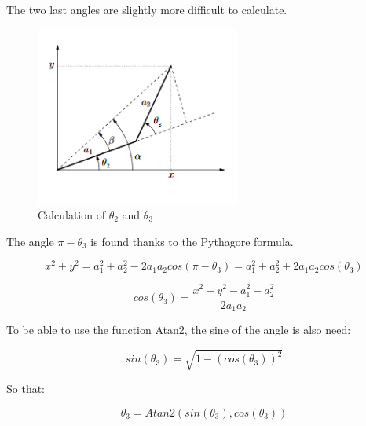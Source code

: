 \noindent The two last angles are slightly more difficult to calculate.\\

\begin{figure}[!ht]
	\centering
    \includegraphics[width = 0.6\textwidth]{Images/angles}
    \caption{Calculation of $\theta_2$ and $\theta_3$}
    \label{fig:angles}
\end{figure}

\noindent The angle $\pi - \theta_3$ is found thanks to the Pythagore formula.\\

\begin{center}
	\begin{equation}
		x^2 + y^2 = a_1^2 + a_2^2 - 2a_1a_2cos(\pi - \theta_3) = a_1^2 + a_2^2 + 2a_1a_2cos(\theta_3)
	\end{equation}
\end{center}

\begin{center}
	\begin{equation}
		cos(\theta_3) = \frac{x^2 + y^2 - a_1^2 - a_2^2}{2a_1a_2}
	\end{equation}
\end{center}

\noindent To be able to use the function Atan2, the sine of the angle is also need:\\

\begin{center}
	\begin{equation}
		sin(\theta_3) = \sqrt{1 - (cos(\theta_3))^2}
	\end{equation}
\end{center}

\noindent So that: 

\begin{center}
	\begin{equation}
		\theta_3 = Atan2(sin(\theta_3),cos(\theta_3))
	\end{equation}
\end{center}

